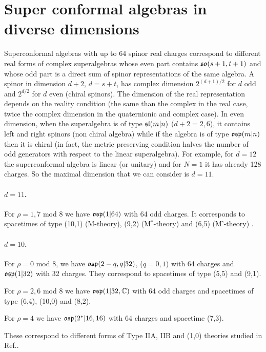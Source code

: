 \documentclass[a4paper,12pt]{article}
\begin{document}
\section{Super conformal algebras in diverse dimensions\label{charges}}

Superconformal algebras with up to 64 spinor real charges
correspond to different real forms of complex superalgebras whose
even part contains $\mathfrak{so}(s+1,t+1)$ and whose odd part is a direct
sum of spinor representations of the same algebra. A spinor in
dimension $d+2$, $d=s+t$, has complex dimension  $2^{(d+1)/2}$ for
$d$ odd and $2^{d/2}$ for $d$ even (chiral spinors). The dimension
of the real representation depends on  the reality condition (the
same than the complex in the real case, twice the complex
dimension in the quaternionic and complex case).  In even
dimension, when the superalgebra is of type $\mathfrak{sl}(m|n)$
($d+2=2,6$), it contains left and right spinors (non chiral
algebra) while if the algebra is of type $\mathfrak{osp}(m|n)$ then it is
chiral (in fact, the metric preserving condition halves the number
of odd generators with respect to the linear superalgebra). For
example, for $d=12$ the superconformal algebra is linear (or
unitary) and for $N=1$ it has already 128 charges. So the maximal
dimension that we can consider is $d=11$.



\paragraph{$d=11$.} For $\rho=1,7$ mod 8 we have $\mathfrak{osp}(1|64)$ with 64 odd charges. It
corresponds to spacetimes of type (10,1) (M-theory), (9,2)
(M$^*$-theory) and (6,5) (M'-theory) \cite{hu}.

\paragraph{$d=10$.}
For $\rho=0$ mod 8, we have $\mathfrak{osp}(2-q,q|32)$, ($q=0,1$) with 64
charges and  $\mathfrak{osp}(1|32)$ with 32 charges. They correspond to
spacetimes of type (5,5) and (9,1).

\smallskip

\noindent For $\rho=2,6$ mod 8  we have $\mathfrak{osp}(1|32,\mathbb{C})$ with 64
odd charges and spacetimes of type (6,4), (10,0) and (8,2).

\smallskip

\noindent For $\rho=4$ we have $\mathfrak{osp}(2^*|16,16)$ with 64 charges
and spacetime (7,3).

These correspond to different forms of Type IIA, IIB and (1,0)
theories studied in Ref.\cite{hu}.
\end{document}
